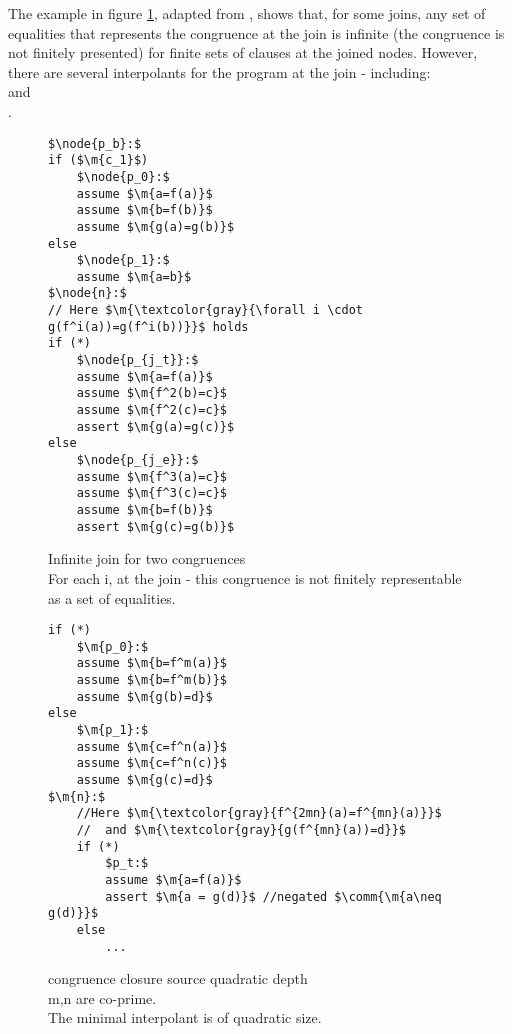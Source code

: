 The example in figure \ref{snippet3.22}, adapted from \cite{GulwaniTiwariNecula04}, shows that, for some joins, any set of equalities that represents the congruence at the join is infinite (the congruence is not finitely presented) for finite sets of clauses at the joined nodes.
However, there are several interpolants for the program at the join - including:\\
 and\\
.


\begin{figure}
\begin{lstlisting}
$\node{p_b}:$
if ($\m{c_1}$)
	$\node{p_0}:$
	assume $\m{a=f(a)}$
	assume $\m{b=f(b)}$
	assume $\m{g(a)=g(b)}$
else
	$\node{p_1}:$
	assume $\m{a=b}$
$\node{n}:$
// Here $\m{\textcolor{gray}{\forall i \cdot g(f^i(a))=g(f^i(b))}}$ holds
if (*)
	$\node{p_{j_t}}:$
	assume $\m{a=f(a)}$
	assume $\m{f^2(b)=c}$
	assume $\m{f^2(c)=c}$
	assert $\m{g(a)=g(c)}$
else
	$\node{p_{j_e}}:$
	assume $\m{f^3(a)=c}$
	assume $\m{f^3(c)=c}$
	assume $\m{b=f(b)}$
	assert $\m{g(c)=g(b)}$
\end{lstlisting}
\caption{Infinite join for two congruences\\
For each i,  at the join  - this congruence is not finitely representable as a set of equalities.\\
}
\label{snippet3.22}
\end{figure}
\noindent

\begin{figure}
\begin{lstlisting}
if (*)
	$\m{p_0}:$
	assume $\m{b=f^m(a)}$
	assume $\m{b=f^m(b)}$
	assume $\m{g(b)=d}$
else
	$\m{p_1}:$
	assume $\m{c=f^n(a)}$
	assume $\m{c=f^n(c)}$
	assume $\m{g(c)=d}$
$\m{n}:$
	//Here $\m{\textcolor{gray}{f^{2mn}(a)=f^{mn}(a)}}$
	//  and $\m{\textcolor{gray}{g(f^{mn}(a))=d}}$
	if (*)
		$p_t:$
		assume $\m{a=f(a)}$
		assert $\m{a = g(d)}$ //negated $\comm{\m{a\neq g(d)}}$
	else
		...
\end{lstlisting}
\caption{congruence closure source quadratic depth\\
m,n are co-prime.\\
The minimal interpolant is of quadratic size.}
\label{snippet3.11}
\end{figure}

